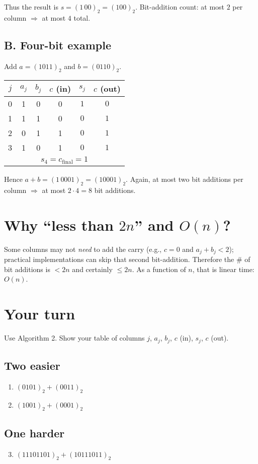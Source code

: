 \documentclass[12pt]{article}
\begin{document}
Thus the result is $s=(1\,00)_2=(100)_2$.  
Bit-addition count: at most $2$ per column $\Rightarrow$ at most $4$ total.

\subsection*{B. Four-bit example}
Add $a=(1011)_2$ and $b=(0110)_2$.

\medskip
\begin{center}
\begin{tabular}{c|c c c|c c}
$j$ & $a_j$ & $b_j$ & $c$ (in) & $s_j$ & $c$ (out)\\\hline
0 & 1 & 0 & 0 & $1$ & $0$\\
1 & 1 & 1 & 0 & $0$ & $1$\\
2 & 0 & 1 & 1 & $0$ & $1$\\
3 & 1 & 0 & 1 & $0$ & $1$\\\hline
\multicolumn{6}{c}{$s_4=c_{\text{final}}=1$}
\end{tabular}
\end{center}

Hence $a+b=(1\,0001)_2=(10001)_2$.  
Again, at most two bit additions per column $\Rightarrow$ at most $2\cdot 4=8$ bit additions.

\section*{Why ``less than $2n$'' and $O(n)$?}
Some columns may not \emph{need} to add the carry (e.g., $c=0$ and $a_j+b_j<2$); practical implementations can skip that second bit-addition. Therefore the \# of bit additions is $<2n$ and certainly $\le 2n$. As a function of $n$, that is linear time: $O(n)$.

\section*{Your turn}
Use Algorithm 2. Show your table of columns $j$, $a_j$, $b_j$, $c$ (in), $s_j$, $c$ (out).

\subsection*{Two easier}
\begin{enumerate}
  \item $(0101)_2 + (0011)_2$
  \item $(1001)_2 + (0001)_2$
\end{enumerate}

\subsection*{One harder}
\begin{enumerate}
  \setcounter{enumi}{2}
  \item $(11101101)_2 + (10111011)_2$
\end{enumerate}
\end{document}
